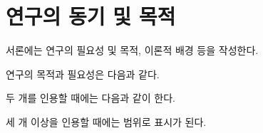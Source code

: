 \section{연구의 동기 및 목적}
서론에는 연구의 필요성 및 목적, 이론적 배경 등을 작성한다.

연구의 목적과 필요성은 다음과 같다\cite{Taylor1989}.

두 개를 인용할 때에는 다음과 같이 한다\cite{aksin,gillies}.

세 개 이상을 인용할 때에는 범위로 표시가 된다\cite{Taylor1989,aksin,gillies,Intel1988}.
